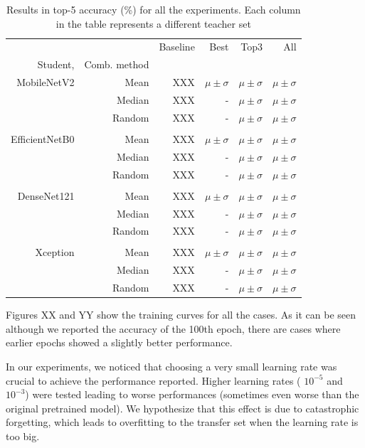 \documentclass{elsarticle}
\begin{document}
	\begin{table}[h]
	\small
	\centering

	\caption{Results in top-5 accuracy (\%) for all the experiments. Each column in the table represents a different teacher set}
	\begin{tabular}{rrrrrr}\toprule
		& &Baseline &Best &Top3 &All \\
		Student, &Comb. method & & & & \\\midrule
		MobileNetV2 &Mean &XXX &$\mu \pm \sigma$ &$\mu \pm \sigma$ &$\mu \pm \sigma$ \\
		&Median &XXX &- &$\mu \pm \sigma$ &$\mu \pm \sigma$ \\
		&Random &XXX &- &$\mu \pm \sigma$ &$\mu \pm \sigma$ \\
		& & & & & \\
		EfficientNetB0 &Mean &XXX &$\mu \pm \sigma$ &$\mu \pm \sigma$ &$\mu \pm \sigma$ \\
		&Median &XXX&- &$\mu \pm \sigma$ &$\mu \pm \sigma$ \\
		&Random &XXX&- &$\mu \pm \sigma$ &$\mu \pm \sigma$ \\
		& & & & & \\
		DenseNet121 &Mean &XXX &$\mu \pm \sigma$ &$\mu \pm \sigma$ &$\mu \pm \sigma$ \\
		&Median &XXX &- &$\mu \pm \sigma$ &$\mu \pm \sigma$ \\
		&Random &XXX &- &$\mu \pm \sigma$ &$\mu \pm \sigma$ \\
		& & & & & \\
		Xception &Mean &XXX &$\mu \pm \sigma$ &$\mu \pm \sigma$ &$\mu \pm \sigma$ \\
		&Median &XXX &- &$\mu \pm \sigma$ &$\mu \pm \sigma$ \\
		&Random &XXX &- &$\mu \pm \sigma$ &$\mu \pm \sigma$ \\
		\bottomrule
	\end{tabular}
	\label{tab:results5}
\end{table}
	
	Figures XX and YY show the training curves for all the cases. As it can be seen although we reported the accuracy of the 100th epoch, there are cases where earlier epochs showed a slightly better performance.
	
	In our experiments, we noticed that choosing a very small learning rate was crucial to achieve the performance reported. Higher learning rates ( $10^{-5}$ and  $10^{-3}$) were tested leading to worse performances (sometimes even worse than the original pretrained model). We hypothesize that this effect is due to catastrophic forgetting, which leads to overfitting to the transfer set when the learning rate is too big.
			
\end{document}
